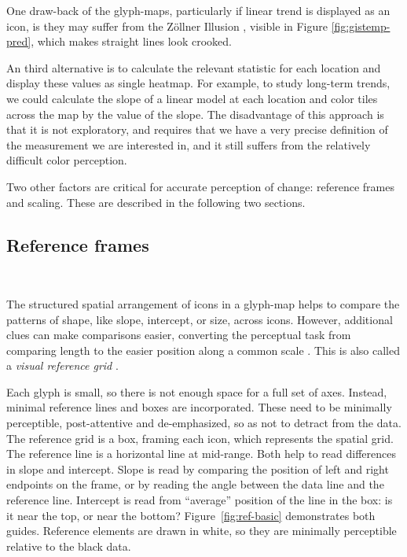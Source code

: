 \documentclass[oneside]{article}
\begin{document}
One draw-back of the glyph-maps, particularly if linear trend is displayed as an icon, is they may suffer from the Z\"ollner Illusion \citep{Zollner}, visible in Figure \ref{fig:gistemp-pred}, which makes straight lines look crooked.

An third alternative is to calculate the relevant statistic for each location and display these values as single heatmap. For example, to study long-term trends, we could calculate the slope of a linear model at each location and color tiles across the map by the value of the slope. The disadvantage of this approach is that it is not exploratory, and requires that we have a very precise definition of the measurement we are interested in, and it still suffers from the relatively difficult color perception.

Two other factors are critical for accurate perception of change: reference frames and scaling. These are described in the following two sections.

\subsection{Reference frames}~\label{sec:reference}

The structured spatial arrangement of icons in a glyph-map helps to compare the patterns of shape, like slope, intercept, or size, across icons. However, additional clues can make comparisons easier, converting the perceptual task from comparing length to the easier position along a common scale \citep{cleveland:1984}. This is also called a \emph{visual reference grid} \citep{cleveland:1993a}.

Each glyph is small, so there is not enough space for a full set of axes. Instead, minimal reference lines and boxes are incorporated. These need to be minimally perceptible, post-attentive \citep{healey} and de-emphasized, so as not to detract from the data. The reference grid is a box, framing each icon, which represents the spatial grid. The reference line is a horizontal line at mid-range. Both help to read differences in slope and intercept. Slope is read by comparing the position of left and right endpoints on the frame, or by reading the angle between the data line and the reference line. Intercept is read from ``average'' position of the line in the box: is it near the top, or near the bottom? Figure~\ref{fig:ref-basic} demonstrates both guides. Reference elements are drawn in white, so they are minimally perceptible relative to the black data.
\end{document}
